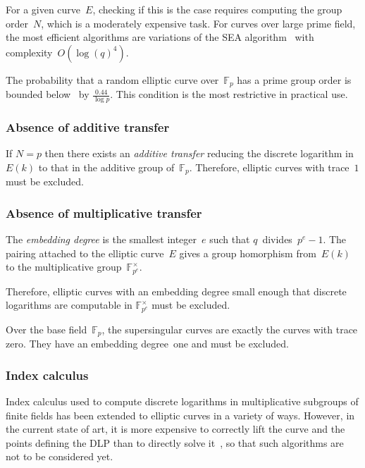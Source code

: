 \documentclass[twocolumn,letterpaper]{article}
\def\F{\mathbb{F}}
\begin{document}
For a given curve~$E$, checking if this is the case
requires computing the group order~$N$,
which is a moderately expensive task.
For curves over large prime field, the most efficient algorithms are variations
of the SEA algorithm~\cite{mathcomp1985schoof,
jtnb1995schoof,smf2008cl} with complexity~$O(\log(q)^4)$.

The probability that a random elliptic curve over~$\F_p$
has a prime group order is bounded below~\cite{lms2000gm}
by $\frac{0.44}{\log p}$.
This condition is the most restrictive in practical use.

\subsubsection{Absence of additive transfer}

If $N = p$ then there exists an \emph{additive transfer}
reducing the discrete logarithm in~$E(k)$
to that in the additive group of~$\F_p$.
Therefore, elliptic curves with trace~$1$ must be excluded.

\subsubsection{Absence of multiplicative transfer}
\label{sss:embedding-degree}

The \emph{embedding degree} is the smallest integer~$e$ such that
$q$~divides~$p^e -1$.
The pairing attached to the elliptic curve~$E$
gives a group homorphism from~$E(k)$
to the multiplicative group~$\F_{p^e}^{×}$.

Therefore, elliptic curves with an embedding degree small enough
that discrete logarithms are computable in $\F_{p^e}^{×}$
must be excluded.

Over the base field~$\F_p$, the supersingular curves
are exactly the curves with trace zero.
They have an embedding degree~one and must be excluded.

\subsubsection{Index calculus}

Index calculus used to compute discrete logarithms in multiplicative subgroups
of finite fields has been extended to elliptic curves in a variety of ways.
However, in the current state of art, it is more expensive
to correctly lift the curve and the points defining the DLP than
to directly solve it~\cite{asia1998ss,dcc2000silverman,dcc2000ksst,ecc2007silverman,sac2008silverman},
so that such algorithms are not to be considered yet.
\end{document}
